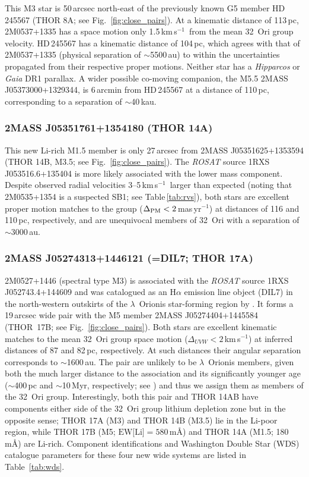 \documentclass[usenatbib]{mnras}
\newcommand{\masyr}{mas\,yr$^{-1}$}
\newcommand{\kms}{\textrm{km\,s$^{-1}$}}
\begin{document}
This M3 star is 50\,arcsec north-east of the previously known G5
member HD\,245567 (THOR 8A; see Fig.~\ref{fig:close_pairs}).  At a kinematic
distance of 113\,pc, 2M0537+1335 has a space motion only
1.5\,\kms\ from the mean 32~Ori group velocity.  HD\,245567 has a
kinematic distance of 104\,pc, which agrees with that of 2M0537+1335 (physical
separation of $\sim$5500\,au) to within the uncertainties propagated from
their respective proper motions. Neither star has a \emph{Hipparcos}
or \emph{Gaia} DR1 parallax. A wider possible co-moving companion, the M5.5
2MASS J05373000+1329344, is 6\,arcmin from HD\,245567 at a distance of
110\,pc, corresponding to a separation of $\sim$40\,kau.

\subsubsection{2MASS J05351761+1354180 (THOR 14A)}

This new Li-rich M1.5 member is only 27\,arcsec from
2MASS J05351625+1353594 (THOR 14B, M3.5; see Fig.~\ref{fig:close_pairs}). The
\emph{ROSAT} source 1RXS J053516.6+135404 is more likely associated
with the lower mass component. Despite observed radial velocities
3--5\,\kms\ larger than expected (noting that 2M0535+1354 is a suspected SB1; see Table\,\ref{tab:rvs}), both stars are excellent
proper motion matches to the group ($\Delta_{\rm
  PM}<2$\,\masyr) at distances of 116 and 110\,pc, respectively, and
are unequivocal members of 32~Ori with a separation of
$\sim$3000\,au.

\subsubsection{2MASS J05274313+1446121 (=DIL7; THOR 17A)} 

2M0527+1446 (spectral type M3) is associated with the \emph{ROSAT}
source 1RXS J052743.4+144609 and was catalogued as an H$\alpha$
emission line object (DIL7) in the north-western outskirts of the
$\lambda$~Orionis star-forming region by \citet*{Duerr82}. It forms a
19\,arcsec wide pair with the M5 member 2MASS J05274404+1445584
(THOR~17B; see Fig.~\ref{fig:close_pairs}). Both stars are excellent kinematic
matches to the mean 32~Ori group space motion ($\Delta_{UVW}<2$\,\kms)
at inferred distances of 87 and 82\,pc, respectively.
At such distances their angular separation corresponds to
$\sim$1600\,au. The pair are unlikely to be $\lambda$~Orionis members,
given both the much larger distance to the association and its
significantly younger age ($\sim$400\,pc and $\sim$10\,Myr,
respectively; see \citealp{Bell13}) and thus we assign them as members
of the 32~Ori group. Interestingly, both this pair and THOR 14AB have
components either side of the 32~Ori group lithium depletion zone but
in the opposite sense; THOR 17A (M3) and THOR 14B (M3.5) lie in
the Li-poor region, while THOR 17B (M5; $\textrm{EW[Li]}=580$\,m\AA)
and THOR 14A (M1.5; 180\,m\AA) are Li-rich. 
Component identifications and Washington Double Star
(WDS) catalogue parameters for these four new wide systems are listed in Table~\ref{tab:wds}.
\end{document}
